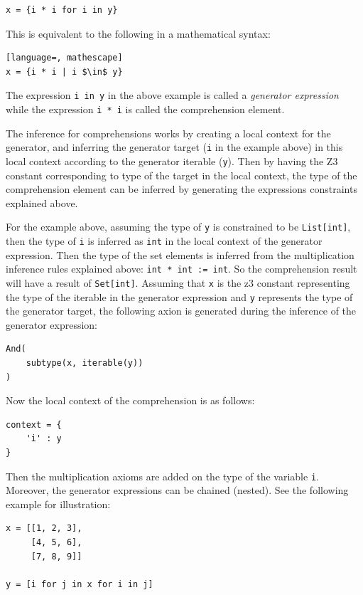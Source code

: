 \begin{lstlisting}
x = {i * i for i in y}
\end{lstlisting}

This is equivalent to the following in a mathematical syntax:
\begin{lstlisting}[language=, mathescape]
x = {i * i | i $\in$ y}
\end{lstlisting}

The expression \lstinline|i in y| in the above example is called a \textit{generator expression} while the expression \lstinline|i * i| is called the comprehension element.

The inference for comprehensions works by creating a local context for the generator, and inferring the generator target (\lstinline|i| in the example above) in this local context according to the generator iterable (\lstinline|y|). Then by having the Z3 constant corresponding to type of the target in the local context, the type of the comprehension element can be inferred by generating the expressions constraints explained above.

For the example above, assuming the type of \lstinline|y| is constrained to be \lstinline|List[int]|, then the type of \lstinline|i| is inferred as \lstinline|int| in the local context of the generator expression. Then the type of the set elements is inferred from the multiplication inference rules explained above: \lstinline|int * int := int|. So the comprehension result will have a result of \lstinline|Set[int]|. Assuming that \lstinline|x| is the z3 constant representing the type of the iterable in the generator expression and \lstinline|y| represents the type of the generator target, the following axion is generated during the inference of the generator expression:
\begin{lstlisting}
And(
	subtype(x, iterable(y))
)
\end{lstlisting}

Now the local context of the comprehension is as follows:
\begin{lstlisting}
context = {
	'i' : y
}
\end{lstlisting}

Then the multiplication axioms are added on the type of the variable \lstinline|i|. \\

Moreover, the generator expressions can be chained (nested). See the following example for illustration:

\begin{lstlisting}
x = [[1, 2, 3],
     [4, 5, 6],
     [7, 8, 9]]
	 
y = [i for j in x for i in j]
\end{lstlisting}

